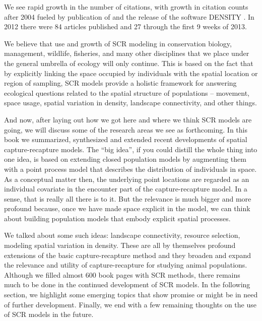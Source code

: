 We see rapid growth in the number of citations, 
with growth in citation counts after 2004 fueled by publication of
\citet{efford:2004} and the release of the software DENSITY
\citep{efford_etal:2004}. In 2012 there were 84 articles published and
27 through the first 9 weeks of 2013.

We believe that use and growth of SCR modeling in conservation biology, 
management, wildlife, fisheries, and many other disciplines that we place under
the general umbrella of ecology will only continue. 
This is based on the fact that by explicitly linking the space occupied by individuals with the
spatial location or region of sampling, SCR models 
provide a holistic framework for answering ecological questions
related to the spatial structure of populations -- movement, space
usage, spatial variation in density, landscape connectivity, and other
things. 

And now, after laying out how we got here and where we think SCR models are 
going, we will discuss some of the research areas we see as forthcoming. 
In this book we summarized, synthesized and extended recent
developments of spatial capture-recapture models. The ``big idea'',
if you could distill the whole thing into one idea, is based on
extending closed population models by augmenting them with a point
process model that describes the distribution of individuals
\citep{efford:2004} in space. As a conceptual matter then, the
underlying point locations are regarded as an individual covariate in
the encounter part of the capture-recapture model. In a sense, that is
really all there is to it. But the relevance is much bigger and more
profound because, once we have made space explicit in the model, 
we can think about building population models that embody explicit
spatial processes. 

We talked about some such ideas: landscape connectivity, resource
selection, modeling spatial variation in density. These are all by
themselves profound extensions of the basic capture-recapture method
and they broaden and expand the relevance and utility of
capture-recapture for studying animal populations.
Although we filled almost 600 book pages with SCR methods,
there remains much to be done in the continued development of SCR
models. In the following section, we highlight some emerging topics that show promise or might be in
need of further development. Finally, we end with a few remaining
thoughts on the use of SCR models in the future.



